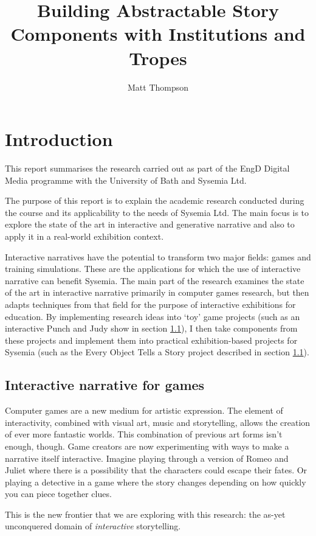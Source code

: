 \documentclass[11pt]{report}
\title{Building Abstractable Story Components with Institutions and Tropes}
\author{Matt Thompson}
\begin{document}
\maketitle
\clearpage
\tableofcontents
\clearpage

\chapter{Introduction}
\label{cha:introduction}
This report summarises the research carried out as part of the EngD Digital Media programme with the University of Bath and Sysemia Ltd.

The purpose of this report is to explain the academic research conducted during the course and its applicability to the needs of Sysemia Ltd. The main focus is to explore the state of the art in interactive and generative narrative and also to apply it in a real-world exhibition context.

Interactive narratives have the potential to transform two major fields: games
and training simulations. These are the applications for which the use of
interactive narrative can benefit Sysemia. The main part of the research examines the state of the art in interactive narrative primarily in computer games research, but then adapts techniques from that field for the purpose of interactive exhibitions for education. By implementing research ideas into `toy' game projects (such as an interactive Punch and Judy show in section \ref{}), I then take components from these projects and implement them into practical exhibition-based projects for Sysemia (such as the Every Object Tells a Story project described in section \ref{}).

\section{Interactive narrative for games}
Computer games are a new medium for artistic expression. The element of interactivity, combined with visual art, music and storytelling, allows the creation of ever more fantastic worlds. This combination of previous art forms isn't enough, though. Game creators are now experimenting with ways to make a narrative itself interactive. Imagine playing through a version of Romeo and Juliet where there is a possibility that the characters could escape their fates. Or playing a detective in a game where the story changes depending on how quickly you can piece together clues.

This is the new frontier that we are exploring with this research: the as-yet unconquered domain of \emph{interactive} storytelling.
\end{document}
